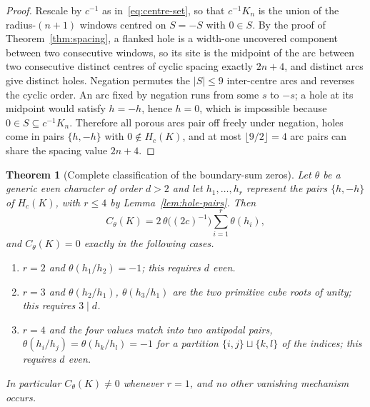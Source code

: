 \documentclass[11pt,a4paper]{article}
\newtheorem{theorem}{Theorem}[section]
\theoremstyle{definition}
\theoremstyle{remark}
\newcommand{\HK}{H_c(K)}
\begin{document}
\begin{proof}
  Rescale by $c^{-1}$ as in~\eqref{eq:centre-set}, so that $c^{-1}K_n$ is the union of the
  radius-$(n+1)$ windows centred on $S=-S$ with $0\in S$.
  By the proof of Theorem~\ref{thm:spacing}, a flanked hole is a width-one uncovered
  component between two consecutive windows, so its site is the midpoint of the arc between
  two consecutive distinct centres of cyclic spacing exactly $2n+4$, and distinct arcs give
  distinct holes.
  Negation permutes the $|S|\leq9$ inter-centre arcs and reverses the cyclic order.
  An arc fixed by negation runs from some $s$ to $-s$; a hole at its midpoint would satisfy
  $h=-h$, hence $h=0$, which is impossible because $0\in S\subseteq c^{-1}K_n$.
  Therefore all porous arcs pair off freely under negation, holes come in pairs $\{h,-h\}$
  with $0\notin\HK$, and at most $\lfloor9/2\rfloor=4$ arc pairs can share the spacing value
  $2n+4$.
\end{proof}

\begin{theorem}[Complete classification of the boundary-sum zeros]
  \label{thm:zero-classification}
  Let $\theta$ be a generic even character of order $d>2$ and let $h_1,\ldots,h_r$ represent
  the pairs $\{h,-h\}$ of $\HK$, with $r\leq4$ by Lemma~\ref{lem:hole-pairs}.
  Then
  \begin{equation}
    C_\theta(K)=2\,\theta\bigl((2c)^{-1}\bigr)\sum_{i=1}^{r}\theta(h_i),
    \label{eq:paired-boundary-sum}
  \end{equation}
  and $C_\theta(K)=0$ exactly in the following cases.
  \begin{enumerate}[label=(\roman*)]
    \item $r=2$ and $\theta(h_1/h_2)=-1$; this requires $d$ even.
    \item $r=3$ and $\theta(h_2/h_1)$, $\theta(h_3/h_1)$ are the two primitive cube roots of
    unity; this requires $3\mid d$.
    \item $r=4$ and the four values match into two antipodal pairs,
    $\theta(h_i/h_j)=\theta(h_k/h_l)=-1$ for a partition $\{i,j\}\sqcup\{k,l\}$ of the
    indices; this requires $d$ even.
  \end{enumerate}
  In particular $C_\theta(K)\ne0$ whenever $r=1$, and no other vanishing mechanism occurs.
\end{theorem}
\end{document}
